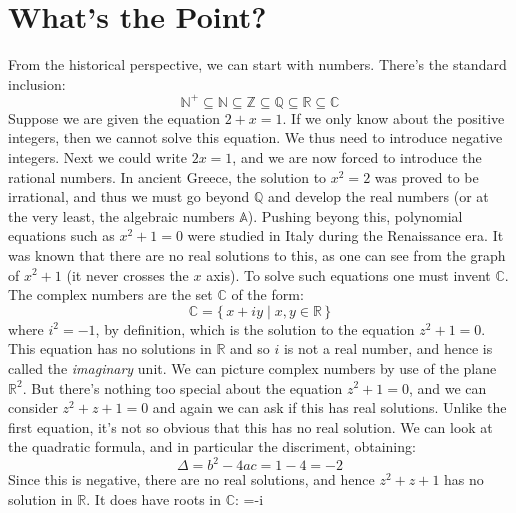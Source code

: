 \section{What's the Point?}
    From the historical perspective, we can start with numbers. There's
    the standard inclusion:
    \begin{equation}
        \mathbb{N}^{+}\subseteq\mathbb{N}\subseteq
        \mathbb{Z}\subseteq\mathbb{Q}\subseteq\mathbb{R}
        \subseteq\mathbb{C}
    \end{equation}
    Suppose we are given the equation $2+x=1$. If we only know about
    the positive integers, then we cannot solve this equation. We thus
    need to introduce negative integers. Next we could write $2x=1$,
    and we are now forced to introduce the rational numbers. In ancient
    Greece, the solution to $x^{2}=2$ was proved to be irrational, and
    thus we must go beyond $\mathbb{Q}$ and develop the real numbers
    (or at the very least, the algebraic numbers $\mathbb{A}$). Pushing
    beyong this, polynomial equations such as $x^{2}+1=0$ were studied
    in Italy during the Renaissance era. It was known that there are no
    real solutions to this, as one can see from the graph of $x^{2}+1$
    (it never crosses the $x$ axis). To solve such equations one must
    invent $\mathbb{C}$. The complex numbers are the set $\mathbb{C}$ of
    the form:
    \begin{equation}
        \mathbb{C}=\{\,x+iy\;|\;x,y\in\mathbb{R}\,\}
    \end{equation}
    where $i^{2}=\minus{1}$, by definition, which is the solution to the
    equation $z^{2}+1=0$. This equation has no solutions in $\mathbb{R}$
    and so $i$ is not a real number, and hence is called the
    \textit{imaginary} unit. We can picture complex numbers by use of
    the plane $\mathbb{R}^{2}$. But there's nothing too special about
    the equation $z^{2}+1=0$, and we can consider $z^{2}+z+1=0$ and
    again we can ask if this has real solutions. Unlike the first
    equation, it's not so obvious that this has no real solution. We
    can look at the quadratic formula, and in particular the discriment,
    obtaining:
    \begin{equation}
        \Delta=b^{2}-4ac=1-4=\minus{2}
    \end{equation}
    Since this is negative, there are no real solutions, and hence
    $z^{2}+z+1$ has no solution in $\mathbb{R}$. It does have roots in
    $\mathbb{C}$:
                {\overline{\omega}=\minus{}-i}
